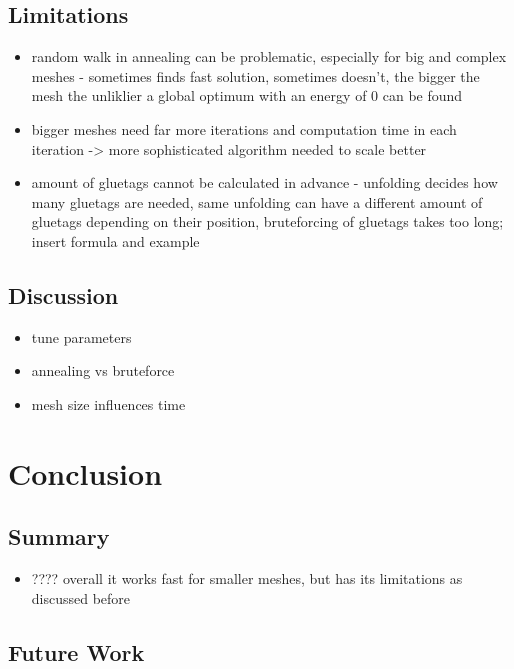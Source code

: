 \documentclass[draft,final]{vutinfth} %
\begin{document}
\section{Limitations}

\begin{itemize}
	\item random walk in annealing can be problematic, especially for big and complex meshes - sometimes finds fast solution, sometimes doesn't, the bigger the mesh the unliklier a global optimum with an energy of 0 can be found
	\item bigger meshes need far more iterations and computation time in each iteration -> more sophisticated algorithm needed to scale better
	\item amount of gluetags cannot be calculated in advance - unfolding decides how many gluetags are needed, same unfolding can have a different amount of gluetags depending on their position, bruteforcing of gluetags takes too long; insert formula and example
\end{itemize}

\section{Discussion}

\begin{itemize}
	\item tune parameters
	\item annealing vs bruteforce
	\item mesh size influences time
\end{itemize}

\chapter{Conclusion}

\section{Summary}

\begin{itemize}
	\item ???? overall it works fast for smaller meshes, but has its limitations as discussed before
\end{itemize}

\section{Future Work}
\end{document}
